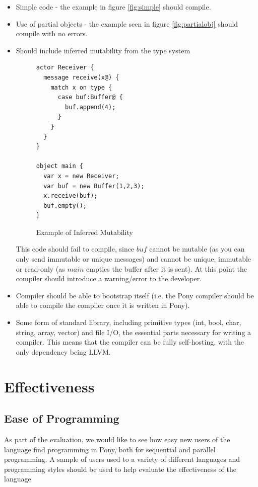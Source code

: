 \documentclass[pdftex,11pt,a4paper]{report}
\begin{document}
\begin{itemize}

\item Simple code - the example in figure \ref{fig:simple} should compile.
\item Use of partial objects - the example seen in figure \ref{fig:partialobj} should compile with no errors.

\item Should include inferred mutability from the type system

\begin{figure}[H]
\begin{verbatim}
actor Receiver {
  message receive(x@) {
    match x on type {
      case buf:Buffer@ {
        buf.append(4);
      }
    }
  }
}

object main {
  var x = new Receiver;
  var buf = new Buffer(1,2,3);
  x.receive(buf);
  buf.empty();
}
\end{verbatim}
\caption{Example of Inferred Mutability}
\end{figure}

This code should fail to compile, since $buf$ cannot be mutable (as you can only send immutable or unique messages) and cannot be unique, immutable or read-only (as $main$ empties the buffer after it is sent).
At this point the compiler should introduce a warning/error to the developer.

\item Compiler should be able to bootstrap itself (i.e. the Pony compiler should be able to compile the compiler once it is written in Pony).

\item Some form of standard library, including primitive types (int, bool, char, string, array, vector) and file I/O, the essential parts necessary for writing a compiler.
	This means that the compiler can be fully self-hosting, with the only dependency being LLVM.
\end{itemize}

\section{Effectiveness}
\subsection{Ease of Programming}

As part of the evaluation, we would like to see how easy new users of the language find programming in Pony, both for sequential and parallel programming.
A sample of users used to a variety of different languages and programming styles should be used to help evaluate the effectiveness of the language
\end{document}
